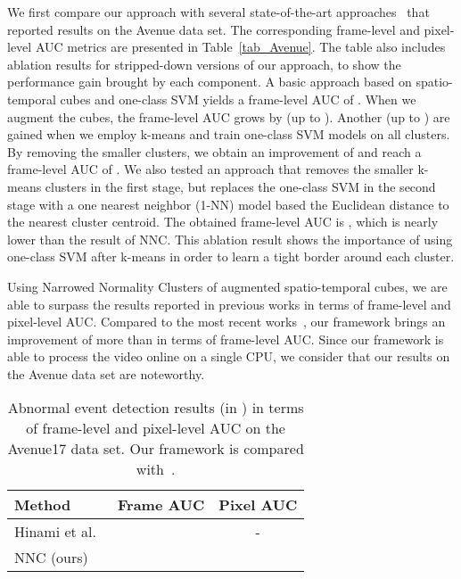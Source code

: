 \documentclass[10pt,twocolumn,letterpaper]{article}
\begin{document}
We first compare our approach with several state-of-the-art approaches~\cite{Giorno-ECCV-2016,Hasan-CVPR-2016,Ionescu-ICCV-2017,Liu-CVPR-2018,Lu-ICCV-2013,Luo-ICCV-2017,Smeureanu-ICIAP-2017} that reported results on the Avenue data set. The corresponding frame-level and pixel-level AUC metrics are presented in Table~\ref{tab_Avenue}. The table also includes ablation results for stripped-down versions of our approach, to show the performance gain brought by each component. A basic approach based on spatio-temporal cubes and one-class SVM yields a frame-level AUC of . When we augment the cubes, the frame-level AUC grows by  (up to ). Another  (up to ) are gained when we employ k-means and train one-class SVM models on all  clusters. By removing the smaller clusters, we obtain an improvement of  and reach a frame-level AUC of . We also tested an approach that removes the smaller k-means clusters in the first stage, but replaces the one-class SVM in the second stage with a one nearest neighbor (1-NN) model based the Euclidean distance to the nearest cluster centroid. The obtained frame-level AUC is , which is nearly  lower than the result of NNC. This ablation result shows the importance of using one-class SVM after k-means in order to learn a tight border around each cluster.

Using Narrowed Normality Clusters of augmented spatio-temporal cubes, we are able to surpass the results reported in previous works in terms of frame-level and pixel-level AUC. Compared to the most recent works~\cite{Ionescu-ICCV-2017,Liu-CVPR-2018,Luo-ICCV-2017,Smeureanu-ICIAP-2017}, our framework brings an improvement of more than  in terms of frame-level AUC. Since our framework is able to process the video online on a single CPU, we consider that our results on the Avenue data set are noteworthy.

\begin{table}[t]
\small{
\begin{center}
\begin{tabular}{|l|c|c|}
\hline
Method 															& Frame AUC    	& Pixel AUC 	\\
\hline
\hline
Hinami et al.~\cite{Hinami-ICCV-2017}				& 			& - \\
\hline
NNC (ours)	 													& 			&  \\
\hline
\end{tabular}
\end{center}
\vspace*{-0.1cm}
\caption{Abnormal event detection results (in ) in terms of frame-level and pixel-level AUC on the Avenue17 data set. Our framework is compared with~\cite{Hinami-ICCV-2017}.\label{tab_Avenue17}}
}
\vspace*{-0.1cm}
\end{table}
\end{document}
